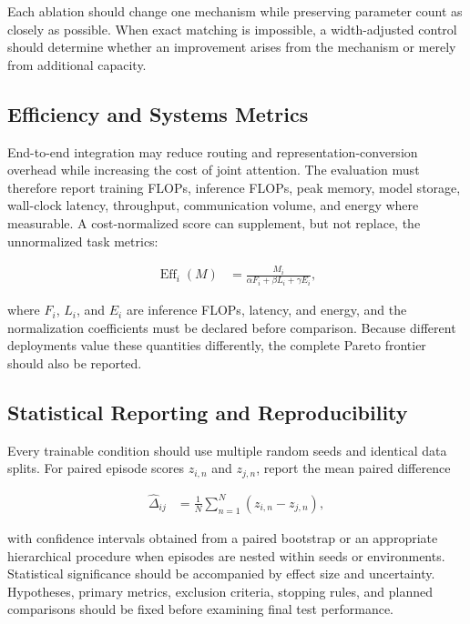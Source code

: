 Each ablation should change one mechanism while preserving parameter count as closely as possible. When exact matching is impossible, a width-adjusted control should determine whether an improvement arises from the mechanism or merely from additional capacity.

\subsection{\textbf{Efficiency and Systems Metrics}}

End-to-end integration may reduce routing and representation-conversion overhead while increasing the cost of joint attention. The evaluation must therefore report training FLOPs, inference FLOPs, peak memory, model storage, wall-clock latency, throughput, communication volume, and energy where measurable. A cost-normalized score can supplement, but not replace, the unnormalized task metrics:

\begin{equation}
\begin{aligned}
    \operatorname{Eff}_{i}(M)
    &= \frac{M_i}{
       \alpha F_i+\beta L_i+\gamma E_i
       },
\end{aligned}
\label{eq:cost_normalized_efficiency}
\end{equation}

where $F_i$, $L_i$, and $E_i$ are inference FLOPs, latency, and energy, and the normalization coefficients must be declared before comparison. Because different deployments value these quantities differently, the complete Pareto frontier should also be reported.

\subsection{\textbf{Statistical Reporting and Reproducibility}}

Every trainable condition should use multiple random seeds and identical data splits. For paired episode scores $z_{i,n}$ and $z_{j,n}$, report the mean paired difference

\begin{equation}
\begin{aligned}
    \widehat{\Delta}_{ij}
    &= \frac{1}{N}\sum_{n=1}^{N}
       \left(z_{i,n}-z_{j,n}\right),
\end{aligned}
\label{eq:paired_effect}
\end{equation}

with confidence intervals obtained from a paired bootstrap or an appropriate hierarchical procedure when episodes are nested within seeds or environments. Statistical significance should be accompanied by effect size and uncertainty. Hypotheses, primary metrics, exclusion criteria, stopping rules, and planned comparisons should be fixed before examining final test performance.

